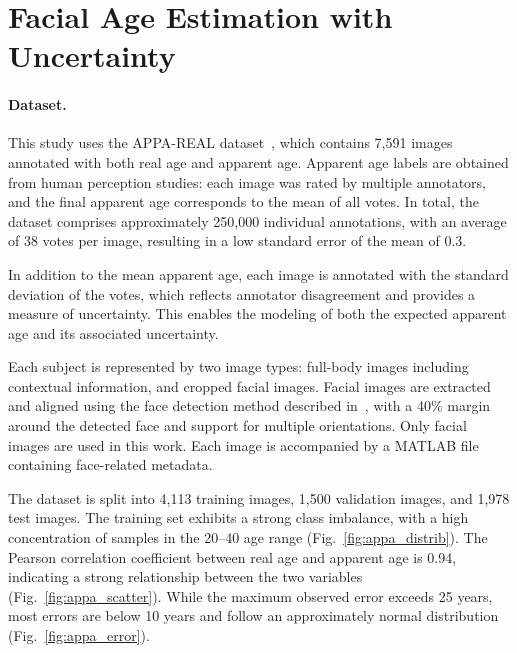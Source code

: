 \documentclass[runningheads]{llncs}
\begin{document}
\section{Facial Age Estimation with Uncertainty}
\label{sec:method}

\paragraph{Dataset.}
This study uses the APPA-REAL dataset~\cite{agustsson2017appareal}, which contains 7,591 images annotated with both real age and apparent age. Apparent age labels are obtained from human perception studies: each image was rated by multiple annotators, and the final apparent age corresponds to the mean of all votes. In total, the dataset comprises approximately 250,000 individual annotations, with an average of 38 votes per image, resulting in a low standard error of the mean of 0.3.

In addition to the mean apparent age, each image is annotated with the standard deviation of the votes, which reflects annotator disagreement and provides a measure of uncertainty. This enables the modeling of both the expected apparent age and its associated uncertainty.

Each subject is represented by two image types: full-body images including contextual information, and cropped facial images. Facial images are extracted and aligned using the face detection method described in~\cite{mathias2014face}, with a 40\% margin around the detected face and support for multiple orientations. Only facial images are used in this work. Each image is accompanied by a MATLAB file containing face-related metadata.

The dataset is split into 4,113 training images, 1,500 validation images, and 1,978 test images. The training set exhibits a strong class imbalance, with a high concentration of samples in the 20--40 age range (Fig.~\ref{fig:appa_distrib}). The Pearson correlation coefficient between real age and apparent age is 0.94, indicating a strong relationship between the two variables (Fig.~\ref{fig:appa_scatter}). While the maximum observed error exceeds 25 years, most errors are below 10 years and follow an approximately normal distribution (Fig.~\ref{fig:appa_error}).
\end{document}
